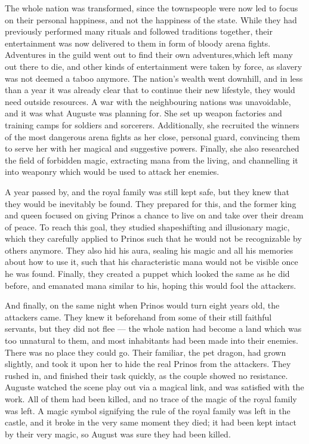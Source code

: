 \fancybreaker{}

The whole nation was transformed, since the townspeople were now led to focus on their personal happiness, and not the happiness of the state. While they had previously performed many rituals and followed traditions together, their entertainment was now delivered to them in form of bloody arena fights. Adventures in the guild went out to find their own adventures,which left many out there to die, and other kinds of entertainment were taken by force, as slavery was not deemed a taboo anymore. The nation's wealth went downhill, and in less than a year it was already clear that to continue their new lifestyle, they would need outside resources. A war with the neighbouring nations was unavoidable, and it was what Auguste was planning for. She set up weapon factories and training camps for soldiers and sorcerers. Additionally, she recruited the winners of the most dangerous arena fights as her close, personal guard, convincing them to serve her with her magical and suggestive powers. Finally, she also researched the field of forbidden magic, extracting mana from the living, and channelling it into weaponry which would be used to attack her enemies.

A year passed by, and the royal family was still kept safe, but they knew that they would be inevitably be found. They prepared for this, and the former king and queen focused on giving Prinos a chance to live on and take over their dream of peace. To reach this goal, they studied shapeshifting and illusionary magic, which they carefully applied to Prinos such that he would not be recognizable by others anymore. They also hid his aura, sealing his magic and all his memories about how to use it, such that his characteristic mana would not be visible once he was found. Finally, they created a puppet which looked the same as he did before, and emanated mana similar to his, hoping this would fool the attackers.

And finally, on the same night when Prinos would turn eight years old, the attackers came. They knew it beforehand from some of their still faithful servants, but they did not flee --- the whole nation had become a land which was too unnatural to them, and most inhabitants had been made into their enemies. There was no place they could go. Their familiar, the pet dragon, had grown slightly, and took it upon her to hide the real Prinos from the attackers. They rushed in, and finished their task quickly, as the couple showed no resistance. Auguste watched the scene play out via a magical link, and was satisfied with the work. All of them had been killed, and no trace of the magic of the royal family was left. A magic symbol signifying the rule of the royal family was left in the castle, and it broke in the very same moment they died; it had been kept intact by their very magic, so August was sure they had been killed.

